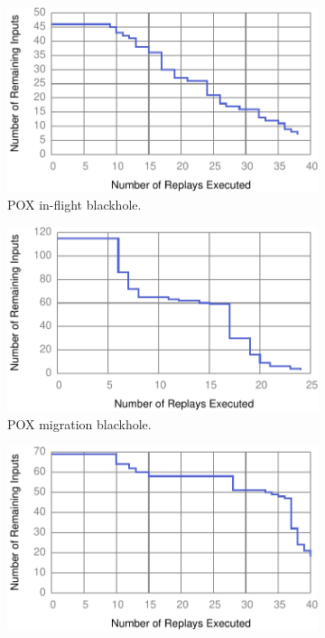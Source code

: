 \begin{figure}[!htb]
\begin{subfigure}{0.33\textwidth}
    \includegraphics[width=\textwidth]{../graphs/runtime/pox_blackhole.pdf}
    \caption[]{\label{fig:pox_discovery} POX in-flight blackhole. }
\end{subfigure}\hfill
\begin{subfigure}{0.33\textwidth}
    \includegraphics[width=\textwidth]{../graphs/runtime/pox_migration_blackhole.pdf}
    \caption[]{\label{fig:pox_migration} POX migration blackhole. }
\end{subfigure}\hfill
\begin{subfigure}{0.33\textwidth}
    \includegraphics[width=\textwidth]{../graphs/runtime/nox_loop.pdf}

\end{subfigure}
\end{figure}
